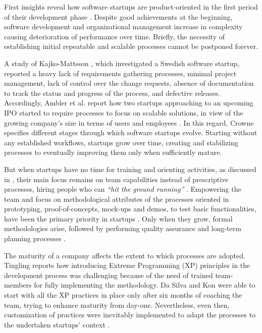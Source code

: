 \documentclass[10pt,journal,letterpaper,compsoc]{IEEEtran}
\begin{document}
First insights reveal how software startups are product-oriented in the first 
period of their development phase \cite{Heitlager2007}. Despite good 
achievements at the beginning, software development and organizational 
management increase in complexity \cite{1456074,Banker1998} causing  
deterioration of performance over time. Briefly, the necessity of establishing 
initial repeatable and scalable processes cannot be postponed forever.

A study of Kajko-Mattsson \cite{Kajko-Mattsson2008}, which investigated a 
Swedish software startup, reported a heavy lack of requirements gathering 
processes, minimal project management, lack of control over the change requests, 
absence of documentation to track the status and progress of the process, and 
defective releases. Accordingly, Ambler et al. report how two startups 
approaching to an upcoming IPO started to require processes to focus on scalable 
solutions, in view of the growing company's size in terms of users and employees 
\cite{Ambler2002}. In this regard, Crowne \cite{Crowne2002} specifies different 
stages through which software startups evolve. Starting without any established 
workflows, startups grow over time, creating and stabilizing processes to 
eventually improving them only when sufficiently mature.

But when startups have no time for training and orienting activities, as 
discussed in \cite{Sutton2000}, their main focus remains on team capabilities 
instead of prescriptive processes, hiring people who can \textit{``hit the 
ground running''} \cite{Yoffie1999}. Empowering the team and focus on 
methodological attributes of the processes oriented in prototyping, 
proof-of-concepts, mock-ups and demos, to test basic functionalities, have been 
the primary priority in startups \cite{Camel1994a}. Only when they grow, formal 
methodologies arise, followed by performing quality assurance and long-term 
planning processes \cite{Yoffie1999}.

The maturity of a company affects the extent to which processes are adopted. 
Tingling \cite{Tingling2007} reports how introducing Extreme Programming (XP) 
principles \cite{Beck:2004:EPE:1076267} in the development process was 
challenging because of the need of trained team-members for fully implementing 
the methodology. Da Silva and Kon \cite{Silva2005} were able to start with all 
the XP practices in place only after six months of coaching the team, trying to 
enhance maturity from day-one. Nevertheless, even then, customization of 
practices were inevitably implemented to adapt the processes to the undertaken 
startups' context \cite{Deias}.
\end{document}
